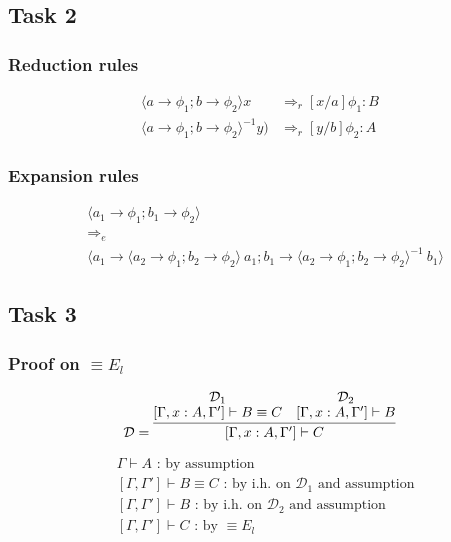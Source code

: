 \documentclass[11pt]{article}
\begin{document}
\subsection{Task 2}

\subsubsection{Reduction rules}

\begin{align*}
   \langle a \to \phi_1; b \to \phi_2 \rangle x &\Longrightarrow_r [x/a]\phi_1: B \\
   \langle a \to \phi_1; b \to \phi_2 \rangle^{-1} y) &\Longrightarrow_r [y/b]\phi_2: A
\end{align*}

\subsubsection{Expansion rules}

\begin{align*}
 &\langle a_1 \to \phi_1; b_1 \to \phi_2  \rangle
 \\&\Longrightarrow_e\\
 &\langle a_1 \to  \langle a_2 \to \phi_1; b_2 \to \phi_2 \rangle~a_1 ;
         b_1 \to  \langle a_2 \to \phi_1; b_2 \to \phi_2 \rangle ^{-1}~b_1
 \rangle
\end{align*}

\subsection{Task 3}

\subsubsection{Proof on $\equiv E_l$}

\[
\mathcal{D} =
\infer
  {[\Gamma, x:A, \Gamma'] \vdash C}
  {
    \deduce{[\Gamma, x:A, \Gamma'] \vdash B \equiv C}{\mathcal{D}_1} &
    \deduce{[\Gamma, x:A, \Gamma'] \vdash B}{\mathcal{D}_2}
  }
\]

\begin{align*}
  & \Gamma \vdash A \text{ : by assumption} \\
  & [\Gamma, \Gamma'] \vdash B \equiv C \text{ : by i.h. on $\mathcal{D}_1$ and assumption} \\
  & [\Gamma, \Gamma'] \vdash B \text{ : by i.h. on $\mathcal{D}_2$ and assumption} \\
  & [\Gamma, \Gamma'] \vdash C \text{ : by $\equiv E_l$}
\end{align*}
\end{document}
